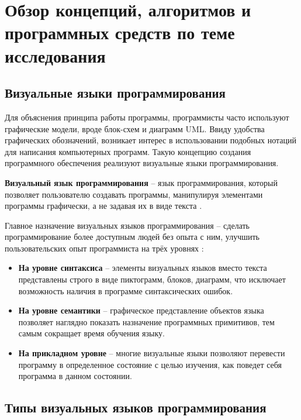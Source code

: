 \chapter{Обзор концепций, алгоритмов и программных средств по теме исследования}\label{ch:ch1}

\section{Визуальные языки программирования}\label{sec:ch1/sec1}

Для объяснения принципа работы программы, программисты часто используют
графические модели, вроде блок-схем и диаграмм UML. Ввиду удобства графических
обозначений, возникает интерес в использовании подобных нотаций для
написания компьютерных программ. Такую концепцию создания программного обеспечения
реализуют визуальные языки программирования.

\textbf{Визуальный язык программирования} -- язык программирования, 
который позволяет пользователю создавать программы, манипулируя элементами
программы графически, а не задавая их в виде текста \cite{maturityofvpl}.

Главное назначение визуальных языков программирования -- сделать 
программирование более доступным людей без опыта с ним,
улучшить пользовательских опыт программиста на трёх уровнях \cite{agentsheetsmovingbeyondsyntax}:

\begin{itemize}
    \item \textbf{На уровне синтаксиса} -- элементы визуальных языков вместо текста 
    представлены строго в виде пиктограмм, блоков, диаграмм, что исключает возможность
    наличия в программе синтаксических ошибок.
    \item \textbf{На уровне семантики} -- графическое представление объектов
    языка позволяет наглядно показать назначение программных примитивов, тем
    самым сокращает время обучения языку.
    \item \textbf{На прикладном уровне} -- многие визуальные языки позволяют
    перевести программу в определенное состояние с целью изучения, как поведет
    себя программа в данном состоянии.
\end{itemize}

\section{Типы визуальных языков программирования}\label{sec:ch1/sec2}

